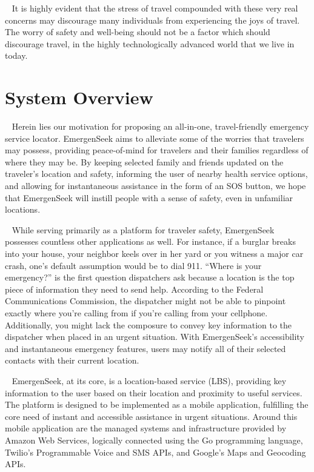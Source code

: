 \documentclass[10pt, a4paper]{article}
\begin{document}
\par ~ It is highly evident that the stress of travel compounded with these very real concerns may discourage many individuals from experiencing the joys of travel. The worry of safety and well-being should not be a factor which should discourage travel, in the highly technologically advanced world that we live in today.

\section{System Overview}
\par ~ Herein lies our motivation for proposing an all-in-one, travel-friendly emergency service locator. EmergenSeek aims to alleviate some of the worries that travelers may possess, providing peace-of-mind for travelers and their families regardless of where they may be. By keeping selected family and friends updated on the traveler’s location and safety, informing the user of nearby health service options, and allowing for instantaneous assistance in the form of an SOS button, we hope that EmergenSeek will instill people with a sense of safety, even in unfamiliar locations.

\par ~ While serving primarily as a platform for traveler safety, EmergenSeek possesses countless other applications as well. For instance, if a burglar breaks into your house, your neighbor keels over in her yard or you witness a major car crash, one’s default assumption would be to dial 911. “Where is your emergency?” is the first question dispatchers ask because a location is the top piece of information they need to send help. According to the Federal Communications Commission, the dispatcher might not be able to pinpoint exactly where you’re calling from if you’re calling from your cellphone. Additionally, you might lack the composure to convey key information to the dispatcher when placed in an urgent situation. With EmergenSeek’s accessibility and instantaneous emergency features, users may notify all of their selected contacts with their current location.

\par ~ EmergenSeek, at its core, is a location-based service (LBS), providing key information to the user based on their location and proximity to useful services. The platform is designed to be implemented as a mobile application, fulfilling the core need of instant and accessible assistance in urgent situations. Around this mobile application are the managed systems and infrastructure provided by Amazon Web Services, logically connected using the Go programming language, Twilio’s Programmable Voice and SMS APIs, and Google’s Maps and Geocoding APIs.
\end{document}
